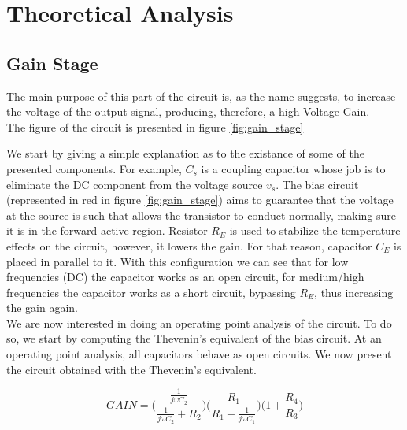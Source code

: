 \section{Theoretical Analysis}
\label{sec:theoretical}



\subsection{Gain Stage}
\par The main purpose of this part of the circuit is, as the name suggests, to increase the voltage of the output signal, producing, therefore, a high Voltage Gain.\\
The figure of the circuit is presented in figure \ref{fig:gain_stage}


We start by giving a simple explanation as to the existance of some of the presented components. For example, $C_s$ is a coupling capacitor whose job is to eliminate the DC component from the voltage source $v_s$. The bias circuit (represented in red in figure \ref{fig:gain_stage}) aims to guarantee that the voltage at the source is such that allows the transistor to conduct normally, making sure it is in the forward active region.
Resistor $R_E$ is used to stabilize the temperature effects on the circuit, however, it lowers the gain. For that reason, capacitor $C_E$ is placed in parallel to it. With this configuration we can see that for low frequencies (DC) the capacitor works as an open circuit, for medium/high frequencies the capacitor works as a short circuit, bypassing $R_E$, thus increasing the gain again.\\

We are now interested in doing an operating point analysis of the circuit. To do so, we start by computing the Thevenin's equivalent of the bias circuit. At an operating point analysis, all capacitors behave as open circuits. We now present the circuit obtained with the Thevenin's equivalent.






\begin{equation}
GAIN=\Bigg( \frac{ \frac{1}{j\omega C_2}}{\frac{1}{j\omega C_2}+R_2} \Bigg) \Bigg( \frac{R_1}{R_1+\frac{1}{j\omega C_1}}   \Bigg)  \Bigg( 1+\frac{R_4}{R_3}  \Bigg)
\end{equation}




